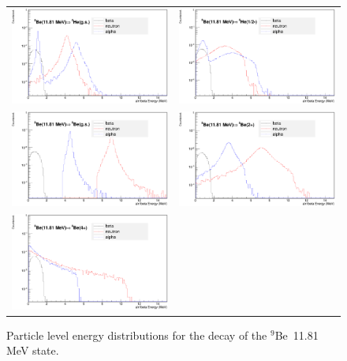 \documentclass{JINST}
\newcommand{\beNINE}{$^{9}$Be~}
\begin{document}
   \begin{figure}[htp]
     \centering
   
  \begin{tabular}{cc}
    \includegraphics[width=70mm]{a_n_beta_spect_c16.eps}&

    \includegraphics[width=70mm]{a_n_beta_spect_c17.eps}\\
    \includegraphics[width=70mm]{a_n_beta_spect_c18.eps}&

    \includegraphics[width=70mm]{a_n_beta_spect_c19.eps}\\
    
    \includegraphics[width=70mm]{a_n_beta_spect_c20.eps}&
   
    \end{tabular}
     \caption{Particle level energy distributions for the decay of the \beNINE 11.81 MeV state.}
    \end{figure}
       
\end{document}
